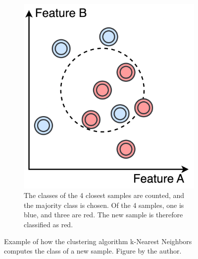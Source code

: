 \begin{figure}[htb]
{\begin{subfigure}[b]{0.37\textwidth}
             \end{subfigure}
             \hspace{0.015\textwidth}
             \begin{subfigure}[b]{0.37\textwidth}
                 \centering
                 \includegraphics[width=\textwidth]{images/knn_3.png}
                 \caption{The classes of the 4 closest samples are counted, and the majority class is chosen. Of the 4 samples, one is blue, and three are red. The new sample is therefore classified as red.} 
             \end{subfigure}
             }
            \caption{Example of how the clustering algorithm k-Nearest Neighbors computes the class of a new sample. Figure by the author.}
            \label{fig:knn}
        \end{figure}
        

